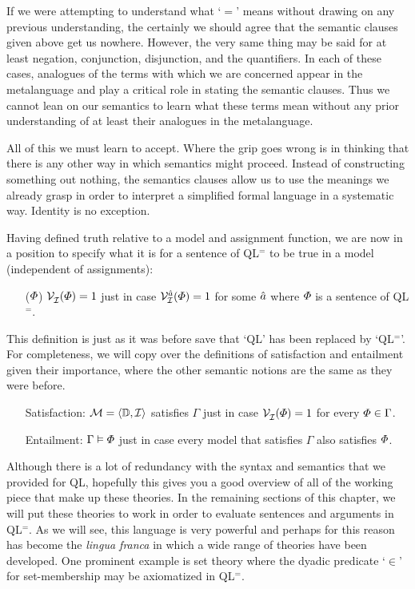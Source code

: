 If we were attempting to understand what `$=$' means without drawing on any previous understanding, the certainly we should agree that the semantic clauses given above get us nowhere.
However, the very same thing may be said for at least negation, conjunction, disjunction, and the quantifiers.
In each of these cases, analogues of the terms with which we are concerned appear in the metalanguage and play a critical role in stating the semantic clauses.
Thus we cannot lean on our semantics to learn what these terms mean without any prior understanding of at least their analogues in the metalanguage.

All of this we must learn to accept.
Where the grip goes wrong is in thinking that there is any other way in which semantics might proceed.
Instead of constructing something out nothing, the semantics clauses allow us to use the meanings we already grasp in order to interpret a simplified formal language in a systematic way.
Identity is no exception.

Having defined truth relative to a model and assignment function, we are now in a position to specify what it is for a sentence of QL$^=$ to be true in a model (independent of assignments):

\begin{enumerate}[labelsep=.15in]
  \item[($\varPhi$)] $\mathcal{V}_{\mathcal{I}}^{}(\varPhi)=1$ just in case $\mathcal{V}_{\mathcal{I}}^{\hat{a}}(\varPhi)=1$ for some $\hat{a}$ where $\varPhi$ is a sentence of QL$^=$.
\end{enumerate}

This definition is just as it was before save that `QL' has been replaced by `QL$^=$'.
For completeness, we will copy over the definitions of satisfaction and entailment given their importance, where the other semantic notions are the same as they were before.

\begin{enumerate}[leftmargin=1.5in]
  \item[\sc Satisfaction:] $\mathcal{M}=\langle\mathbb{D},\mathcal{I}\rangle$ satisfies $\Gamma$ just in case $\mathcal{V}_{\mathcal{I}}^{}(\varPhi)=1$ for every $\varPhi\in\Gamma$.
  \item[\sc Entailment:] $\Gamma\vDash\varPhi$ just in case every model that satisfies $\Gamma$ also satisfies $\varPhi$.
\end{enumerate}

Although there is a lot of redundancy with the syntax and semantics that we provided for QL, hopefully this gives you a good overview of all of the working piece that make up these theories.
In the remaining sections of this chapter, we will put these theories to work in order to evaluate sentences and arguments in QL$^=$.
As we will see, this language is very powerful and perhaps for this reason has become the \textit{lingua franca} in which a wide range of theories have been developed.
One prominent example is set theory where the dyadic predicate `$\in$' for set-membership may be axiomatized in QL$^=$.







